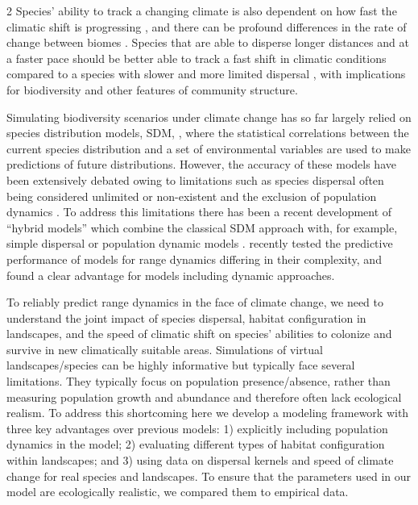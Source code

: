 \documentclass[12pt,pdftex]{article}
\begin{document}
\begin{spacing}{2}
Species' ability to track a changing climate is also dependent on how fast the climatic shift is progressing \citep{Schloss2012a}, and there can be profound differences in the rate of change between biomes \citep{Stocker2013, Loarie2009}. Species that are able to disperse longer distances and at a faster pace should be better able to track a fast shift in climatic conditions compared to a species with slower and more limited dispersal \citep{Walther2002, Angert2011}, with implications for biodiversity and other features of community structure. 

Simulating biodiversity scenarios under climate change has so far largely relied on species distribution models, SDM, \citep{Guisan2000, Thomas2006a}, where  the statistical correlations between the current species distribution and a set of environmental variables are used to make predictions of future distributions. However, the accuracy of these models have been extensively debated \citep{Thuiller2013, Araujo2012a, Wiens2009} owing to limitations such as species dispersal often being considered unlimited or non-existent \citep{Peterson2001, Thuiller2005a} and the exclusion of population dynamics \citep{Zurell2009}. To address this limitations there has been a recent development of ``hybrid models'' which combine the classical SDM approach with, for example, simple dispersal or population dynamic models \citep{Ehrlen2015}. \cite{Zurell2016} recently tested the predictive performance of  models for range dynamics differing in their complexity, and found a clear advantage for models including dynamic approaches. 

To reliably predict range dynamics in the face of climate change, we need to understand the joint impact of species dispersal, habitat configuration in landscapes, and the speed of climatic shift on species' abilities to colonize and survive in new climatically suitable areas. Simulations of virtual landscapes/species can be highly informative but typically face several limitations. They typically focus on population presence/absence, rather than measuring population growth and abundance and therefore often lack ecological realism. To address this shortcoming here we develop a modeling framework with three key advantages over previous models: 1) explicitly including population dynamics in the model; 2) evaluating different types of habitat configuration within landscapes; and 3) using data on dispersal kernels and speed of climate change for real species and landscapes.  To ensure that the parameters used in our model are ecologically realistic, we compared them to empirical data.



\end{spacing}
\end{document}
